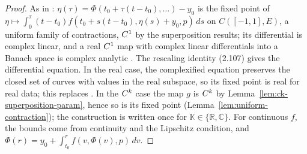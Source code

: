 \begin{proof}
  \leanok
  As in \cite{GN26}: $\eta(\tau) = \Phi(t_0 + \tau(t - t_0), \ldots) - y_0$ is the fixed point
  of $\eta \mapsto \int_0^{\tau} (t - t_0) f(t_0 + s(t - t_0), \eta(s) + y_0, p)\,ds$ on
  $C([-1, 1], E)$, a uniform family of contractions, $C^{1}$ by the superposition results; its
  differential is complex linear, and a real $C^{1}$ map with complex linear differentials into a
  Banach space is complex analytic \cite[Theorem~2.1.12]{GN26}. The rescaling identity (2.107)
  gives the differential equation. In the real case, the complexified equation preserves the closed
  set of curves with values in the real subspace, so its fixed point is real for real data; this
  replaces \cite[Lemma~2.4.30]{GN26}. In the $C^{k}$ case the map $g$ is $C^{k}$ by
  Lemma~\ref{lem:ck-superposition-param}, hence so is its fixed point
  (Lemma~\ref{lem:uniform-contraction}); the construction is written once for $\mathbb{K} \in
  \{\mathbb{R}, \mathbb{C}\}$. For continuous $f$, the bounds come from continuity and the
  Lipschitz condition, and $\Phi(r) = y_0 + \int_{t_0}^r f(v, \Phi(v), p)\,dv$.
\end{proof}

